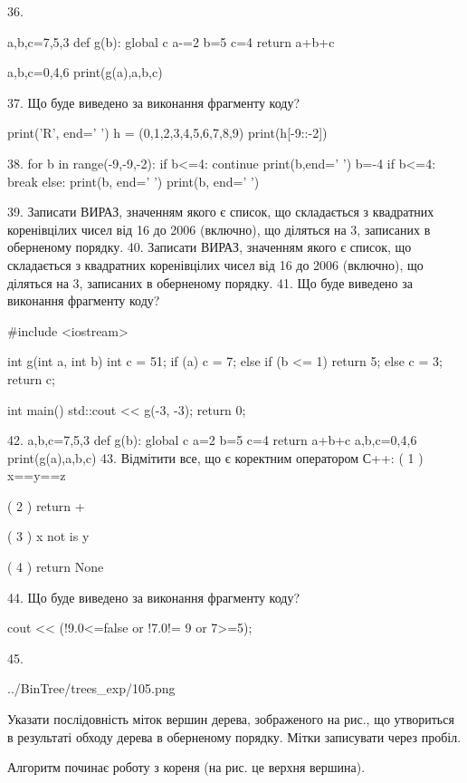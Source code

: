\documentclass[11pt]{article}
\begin{document}
36. 

a,b,c=7,5,3
def g(b):
global c    a-=2
    b=5
    c=4
    return a+b+c

a,b,c=0,4,6
print(g(a),a,b,c)

37. Що буде виведено за виконання фрагменту коду?

print('R', end=' ')
h = (0,1,2,3,4,5,6,7,8,9)
print(h[-9::-2])


38. 
for b in range(-9,-9,-2):
    if b<=4:
        continue
        print(b,end=' ')
        b=-4
    if b<=4:
        break
else:
    print(b, end=' ')
print(b, end=' ')

39. 
Записати ВИРАЗ, значенням якого є список, що складається з квадратних коренівцілих чисел від 16 до 2006 (включно), що діляться на 3, записаних в оберненому порядку.
40. 
Записати ВИРАЗ, значенням якого є список, що складається з квадратних коренівцілих чисел від 16 до 2006 (включно), що діляться на 3, записаних в оберненому порядку.
41. Що буде виведено за виконання фрагменту коду?

#include <iostream>

int g(int a, int b){
    int c = 51;
    if (a)
        c = 7;
    else if (b <= 1)
         return 5;
    else 
        c = 3;
    return c;
}

int main(){
    std::cout << g(-3, -3);
    return 0;
}

42. 
a,b,c=7,5,3
    def g(b):
      global c      a=2
      b=5
      c=4
      return a+b+c
    a,b,c=0,4,6
    print(g(a),a,b,c)
43. %
Відмітити все, що є коректним оператором С++:
( 1 ) x==y==z

( 2 ) return +

( 3 ) x not is y

( 4 ) return None

44. Що буде виведено за виконання фрагменту коду?

cout << (!9.0<=false or !7.0!= 9 or 7>=5);

45. 

\begin{center}
	{../BinTree/trees_exp/105.png}
\end{center}
Указати послідовність міток вершин дерева, зображеного на рис., що утвориться в результаті обходу дерева в оберненому порядку. Мітки записувати через пробіл.\par Алгоритм починає роботу з кореня (на рис. це верхня вершина).
\end{document}
